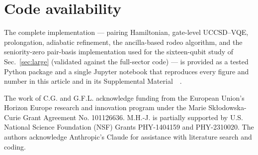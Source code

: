 \documentclass[
  aps,            %
  prc,            %
  reprint,        %
  superscriptaddress,
  floatfix,
  nofootinbib
]{revtex4-2}
\newcommand{\SM}{Supplemental Material~\cite{SM}}
\begin{document}
\section*{Code availability}
The complete implementation --- pairing Hamiltonian, gate-level UCCSD--VQE,
prolongation, adiabatic refinement, the ancilla-based rodeo algorithm, and
the seniority-zero pair-basis implementation used for the sixteen-qubit
study of Sec.~\ref{sec:large} (validated against the full-sector code) ---
is provided as a tested Python package and a single Jupyter notebook that
reproduces every figure and number in this article and in its
\SM{}~\cite{Code}.
\begin{acknowledgments}
The work of C.G. and G.F.L. acknowledge funding from the
European Union’s Horizon Europe research and innovation program under the Marie Skłodowska-Curie Grant Agreement No.
101126636. M.H.-J. is partially supported by U.S. National Science Foundation
(NSF) Grants PHY-1404159 and PHY-2310020. 
The authors  acknowledge Anthropic’s Claude
for assistance with literature search and coding.

\end{acknowledgments}
\end{document}
